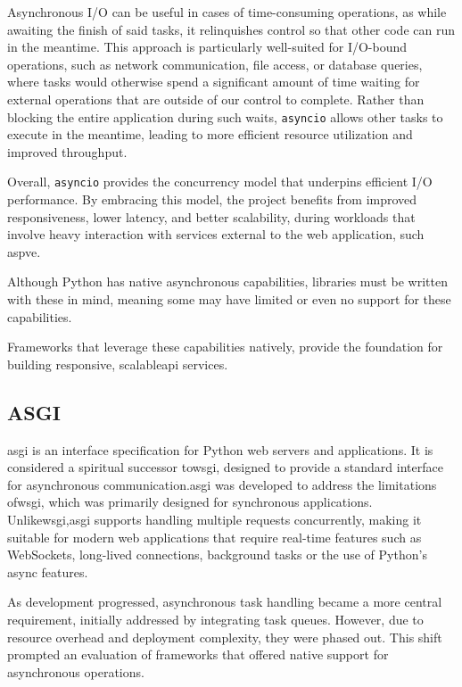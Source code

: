       Asynchronous I/O can be useful in cases of time-consuming operations, as while awaiting the finish of said tasks, it relinquishes control 
      so that other code can run in the meantime. This approach is particularly well-suited for I/O-bound operations, such as network 
      communication, file access, or database queries, where tasks would otherwise spend a significant amount of time waiting for external operations that 
      are outside of our control to complete. Rather than blocking the entire application during such waits, \texttt{asyncio} allows other tasks to 
      execute in the meantime, leading to more efficient resource utilization and improved throughput.

      Overall, \texttt{asyncio} provides the concurrency model that underpins efficient I/O performance. By embracing this model, 
      the project benefits from improved responsiveness, lower latency, and better scalability, during workloads that 
      involve heavy interaction with services external to the web application, such as\ac{pve}.

      Although Python has native asynchronous capabilities, libraries must be written with these in mind, meaning some may have limited 
      or even no support for these capabilities.

      Frameworks that leverage these capabilities natively, provide the foundation for building responsive, scalable\ac{api} 
      services.

  \subsection{ASGI}

    \ac{asgi} is an interface specification for Python web servers and applications. It is considered a spiritual successor 
    to\ac{wsgi}, designed to provide a standard interface for asynchronous communication.\ac{asgi} was developed to address the 
    limitations of\ac{wsgi}, which was primarily designed for synchronous applications. Unlike\ac{wsgi},\ac{asgi} supports 
    handling multiple requests concurrently, making it suitable for modern web applications that require real-time features such 
    as WebSockets, long-lived connections, background tasks or the use of Python's async features.
    
    As development progressed, asynchronous task handling became a more central requirement, initially addressed by integrating 
    task queues. However, due to resource overhead and deployment complexity, they were phased out. This shift prompted an evaluation 
    of frameworks that offered native support for asynchronous operations.
    
